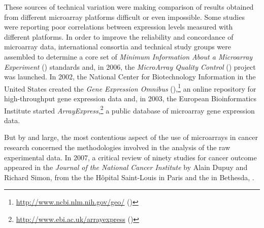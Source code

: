 These sources of technical variation were making comparison of results obtained
from different microarray platforms difficult or even impossible.  Some studies
were reporting poor correlations between expression levels measured with
different platforms.\cite{tan_evaluation_2003,shi_cross-platform_2005} In order
to improve the reliability and concordance of microarray data, international
consortia and technical study groups were assembled to determine a core set of
\emph{Minimum Information About a Microarray Experiment} ()
standards\cite{brazma_minimum_2001} and, in 2006, the \emph{MicroArray Quality
  Control} () project was
launched.\cite{maqc_consortium_microarray_2006} In 2002, the National Center for
Biotechnology Information in the United States created the \emph{Gene Expression
  Omnibus} (),\footnote{\url{http://www.ncbi.nlm.nih.gov/geo/}
  (\citealp{edgar_gene_2002})} an online repository for \mbox{high-throughput}
gene expression data and, in 2003, the European Bioinformatics Institute started
\emph{ArrayExpress},\footnote{\url{http://www.ebi.ac.uk/arrayexpress}
  (\citealp{brazma_arrayexpress--public_2003})} a public database of microarray
gene expression data.

But by and large, the most contentious aspect of the use of microarrays in
cancer research concerned the methodologies involved in the analysis of the raw
experimental data.  In 2007, a critical review of ninety studies for cancer
outcome appeared in the \emph{Journal of the National Cancer Institute} by Alain
Dupuy and Richard Simon, from the the Hôpital Saint-Louis in Paris and the
 in Bethesda, .\cite{dupuy_critical_2007}






